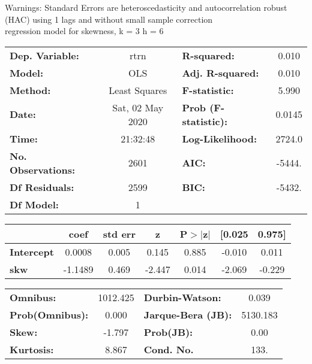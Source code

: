 Warnings: \newline
 [1] Standard Errors are heteroscedasticity and autocorrelation robust (HAC) using 1 lags and without small sample correction\\ 

regression model for skewness, k = 3 h = 6\begin{center}
\begin{tabular}{lclc}
\toprule
\textbf{Dep. Variable:}    &       rtrn       & \textbf{  R-squared:         } &     0.010   \\
\textbf{Model:}            &       OLS        & \textbf{  Adj. R-squared:    } &     0.010   \\
\textbf{Method:}           &  Least Squares   & \textbf{  F-statistic:       } &     5.990   \\
\textbf{Date:}             & Sat, 02 May 2020 & \textbf{  Prob (F-statistic):} &   0.0145    \\
\textbf{Time:}             &     21:32:48     & \textbf{  Log-Likelihood:    } &    2724.0   \\
\textbf{No. Observations:} &        2601      & \textbf{  AIC:               } &    -5444.   \\
\textbf{Df Residuals:}     &        2599      & \textbf{  BIC:               } &    -5432.   \\
\textbf{Df Model:}         &           1      & \textbf{                     } &             \\
\bottomrule
\end{tabular}
\begin{tabular}{lcccccc}
                   & \textbf{coef} & \textbf{std err} & \textbf{z} & \textbf{P$> |$z$|$} & \textbf{[0.025} & \textbf{0.975]}  \\
\midrule
\textbf{Intercept} &       0.0008  &        0.005     &     0.145  &         0.885        &       -0.010    &        0.011     \\
\textbf{skw}       &      -1.1489  &        0.469     &    -2.447  &         0.014        &       -2.069    &       -0.229     \\
\bottomrule
\end{tabular}
\begin{tabular}{lclc}
\textbf{Omnibus:}       & 1012.425 & \textbf{  Durbin-Watson:     } &    0.039  \\
\textbf{Prob(Omnibus):} &   0.000  & \textbf{  Jarque-Bera (JB):  } & 5130.183  \\
\textbf{Skew:}          &  -1.797  & \textbf{  Prob(JB):          } &     0.00  \\
\textbf{Kurtosis:}      &   8.867  & \textbf{  Cond. No.          } &     133.  \\
\bottomrule
\end{tabular}
\end{center}

